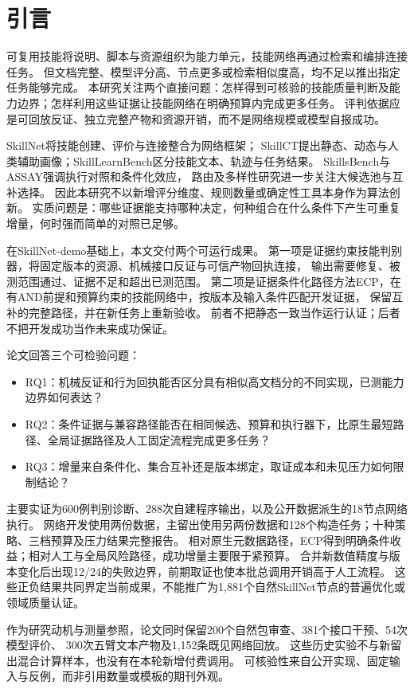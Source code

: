 \section{引言}
可复用技能将说明、脚本与资源组织为能力单元，技能网络再通过检索和编排连接任务。
但文档完整、模型评分高、节点更多或检索相似度高，均不足以推出指定任务能够完成。
本研究关注两个直接问题：怎样得到可核验的技能质量判断及能力边界；怎样利用这些证据让技能网络在明确预算内完成更多任务。
评判依据应是可回放反证、独立完整产物和资源开销，而不是网络规模或模型自报成功。

SkillNet将技能创建、评价与连接整合为网络框架\citep{P01}；
SkillCT提出静态、动态与人类辅助画像\citep{P43}；SkillLearnBench区分技能文本、轨迹与任务结果\citep{P44}。
SkillsBench与ASSAY强调执行对照和条件化效应\citep{P02,P03}，
路由及多样性研究进一步关注大候选池与互补选择\citep{P04,P05}。
因此本研究不以新增评分维度、规则数量或确定性工具本身作为算法创新。
实质问题是：哪些证据能支持哪种决定，何种组合在什么条件下产生可重复增量，何时强而简单的对照已足够。

在SkillNet-demo基础上，本文交付两个可运行成果。
第一项是证据约束技能判别器，将固定版本的资源、机械接口反证与可信产物回执连接，
输出需要修复、被测范围通过、证据不足和超出已测范围。
第二项是证据条件化路径方法ECP，在有AND前提和预算约束的技能网络中，按版本及输入条件匹配开发证据，
保留互补的完整路径，并在新任务上重新验收。
前者不把静态一致当作运行认证；后者不把开发成功当作未来成功保证。

论文回答三个可检验问题：
\begin{itemize}
\item RQ1：机械反证和行为回执能否区分具有相似高文档分的不同实现，已测能力边界如何表达？
\item RQ2：条件证据与兼容路径能否在相同候选、预算和执行器下，比原生最短路径、全局证据路径及人工固定流程完成更多任务？
\item RQ3：增量来自条件化、集合互补还是版本绑定，取证成本和未见压力如何限制结论？
\end{itemize}

主要实证为600例判别诊断、288次自建程序输出，以及公开数据派生的18节点网络执行。
网络开发使用两份数据，主留出使用另两份数据和128个构造任务；十种策略、三档预算及压力结果完整报告。
相对原生元数据路径，ECP得到明确条件收益；相对人工与全局风险路径，成功增量主要限于紧预算。
合并新数值精度与版本变化后出现12/24的失败边界，前期取证也使本批总调用开销高于人工流程。
这些正负结果共同界定当前成果，不能推广为1,881个自然SkillNet节点的普遍优化或领域质量认证。

作为研究动机与测量参照，论文同时保留200个自然包审查、381个接口干预、54次模型评价、
300次五臂文本产物及1,152条既见网络回放。
这些历史实验不与新留出混合计算样本，也没有在本轮新增付费调用。
可核验性来自公开实现、固定输入与反例，而非引用数量或模板的期刊外观。
